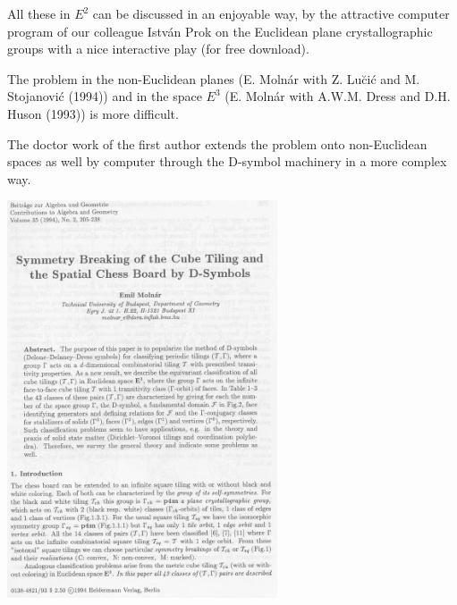 \begin{frame}
All these  in  $E^2$  can  be  discussed  in  an  enjoyable  way,  by  the
attractive computer program of our colleague István Prok  on  the  Euclidean
plane crystallographic  groups  with  a  nice  interactive  play  (for  free
download).
\vfill

The problem in the non-Euclidean planes (E. Molnár with  Z.  Lu\u{c}i\'{c}  and
M. Stojanovi\'{c} (1994)) and in the space $E^3$ (E. Molnár with A.W.M.  Dress  and
D.H. Huson (1993)) is more difficult.
\vfill

The doctor work of the first author extends the problem onto non-Euclidean
spaces as well by computer through the D-symbol machinery in a more complex
way.
\vfill

\end{frame}

\begin{frame}
  \center\includegraphics[width=0.6\textwidth]{illustration1.png}
\end{frame}

